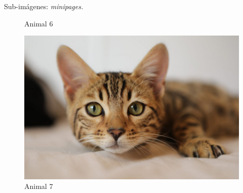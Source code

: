 \documentclass[dvipsnames,xcolor=x11names]{beamer}
\theoremstyle{plain}
\theoremstyle{definition}
\begin{document}
\begin{frame}[fragile]{Sub-imágenes: \itshape minipages.}
\begin{figure}
\begin{minipage}{0.4\linewidth}
    \caption{Animal 6}
    \end{minipage}
    \begin{minipage}{0.4\linewidth}
    \centering \includegraphics[width=0.7\linewidth]{animals/animal7.jpg}
    \caption{Animal 7}
    \end{minipage}
\end{figure}
\end{frame}
\end{document}
